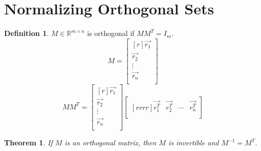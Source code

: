 \documentclass{report}
\theoremstyle{plain}
\newtheorem*{thrm}{Theorem}
\theoremstyle{definition}
\newtheorem*{defn}{Definition}
\theoremstyle{plain}
\begin{document}
\section{Normalizing Orthogonal Sets}
\begin{defn}
$M\in \mathbb{R}^{m\times n}$ is orthogonal if $MM^T=I_m$.
\[ M=\begin{bmatrix}[r]\vec{r_1}\\\vec{r_2}\\\vdots\\\vec{r_n}\\\end{bmatrix} \]
\[ MM^T = \begin{bmatrix}[r]\vec{r_1}\\\vec{r_2}\\\vdots\\\vec{r_n}\\\end{bmatrix}\begin{bmatrix}[rrrr]\vec{r_1^T} & \vec{r_2^T} & \cdots & \vec{r_n^T}\\\end{bmatrix} \]
\end{defn}
\begin{thrm}
If $M$ is an orthogonal matrix, then $M$ is invertible and $M^{-1}=M^T$.
\end{thrm}
\end{document}
